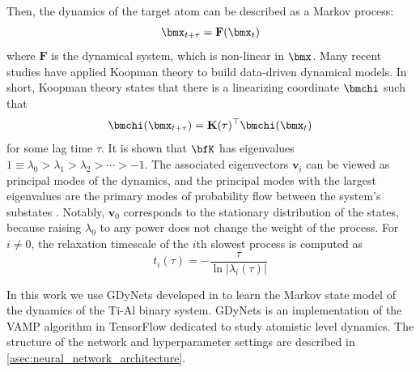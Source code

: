 Then, the dynamics of the target atom can be described as a Markov process:\cite{xie2019graph}
\begin{equation}
    \bmx_{t+\tau} = \mathbf{F}(\bmx_t)
\end{equation}
where $\mathbf{F}$ is the dynamical system, which is non-linear in $\bmx$. Many recent studies have applied Koopman theory to build data-driven dynamical models. In short, Koopman theory states that there is a linearizing coordinate $\bmchi$ such that 
\begin{equation}
    \bmchi(\bmx_{t+\tau}) = \mathbf{K}(\tau)^\top\bmchi(\bmx_t)
\end{equation}
for some lag time $\tau$. It is shown that $\bfK$ has eigenvalues $1 \equiv \lambda_0 > \lambda_1 > \lambda_2 > \cdots > -1$.\cite{bowman2013introduction} The associated eigenvectors $\mathbf{v}_i$ can be viewed as principal modes of the dynamics, and the principal modes with the largest eigenvalues are the primary modes of probability flow between the system's substates \cite{bowman2013introduction}. Notably, $\mathbf{v}_0$ corresponds to the stationary distribution of the states, because raising $\lambda_0$ to any power does not change the weight of the process.\cite{prinz2011markov} For $i \neq 0$, the relaxation timescale of the $i$th slowest process is computed as
\begin{equation}
    t_i(\tau) = - \frac{\tau}{\ln \lvert \lambda_i(\tau) \rvert}
\end{equation}






In this work we use GDyNets developed in \cite{xie2019graph} to learn the Markov state model of the dynamics of the Ti-Al binary system. GDyNets is an implementation of the VAMP algorithm in TensorFlow dedicated to study atomistic level dynamics. The structure of the network and hyperparameter settings are described in \cref{asec:neural_network_architecture}.


